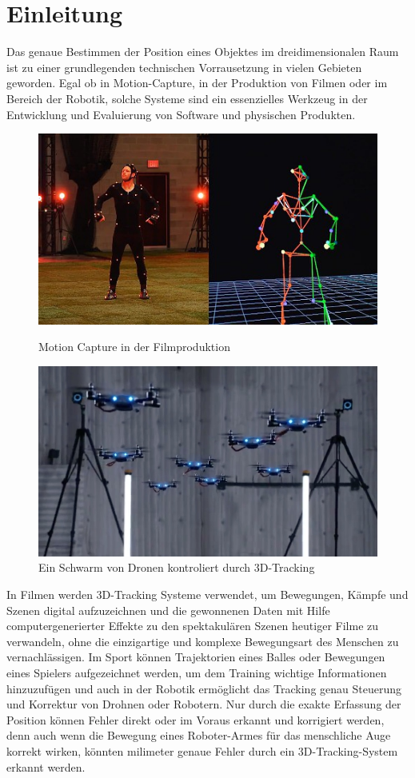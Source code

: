 \documentclass[12pt]{article}
\begin{document}
\section{Einleitung}
Das genaue Bestimmen der Position eines Objektes im dreidimensionalen Raum ist zu einer grundlegenden technischen Vorrausetzung in vielen Gebieten geworden. Egal ob in Motion-Capture, in der Produktion von Filmen oder im Bereich der Robotik, solche Systeme sind ein essenzielles Werkzeug in der Entwicklung und Evaluierung von Software und physischen Produkten.\par
\begin{figure}
    \includegraphics[width=\linewidth]{motion_capture_fifa.jpg}
    \caption{Motion Capture in der Filmproduktion}
    \includegraphics[width=\linewidth]{drones.jpg}
    \caption{Ein Schwarm von Dronen kontroliert durch 3D-Tracking}
\end{figure}
In Filmen werden 3D-Tracking Systeme verwendet, um Bewegungen, Kämpfe und Szenen digital aufzuzeichnen und die gewonnenen Daten mit Hilfe computergenerierter Effekte zu den spektakulären Szenen heutiger Filme zu verwandeln, ohne die einzigartige und komplexe Bewegungsart des Menschen zu vernachlässigen. Im Sport können Trajektorien eines Balles oder Bewegungen eines Spielers aufgezeichnet werden, um dem Training wichtige Informationen hinzuzufügen und auch in der Robotik ermöglicht das Tracking genau Steuerung und Korrektur von Drohnen oder Robotern. Nur durch die exakte Erfassung der Position können Fehler direkt oder im Voraus erkannt und korrigiert werden, denn auch wenn die Bewegung eines Roboter-Armes für das menschliche Auge korrekt wirken, könnten milimeter genaue Fehler durch ein 3D-Tracking-System erkannt werden. 
\end{document}
